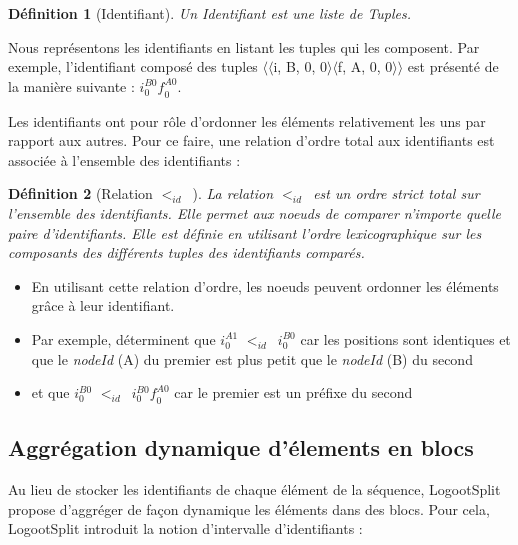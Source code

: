 \documentclass[12pt]{thesul}
\newtheorem{definition}{Définition}
\newcommand{\trm}[1]{\mathit{#1}}
\newcommand{\id}[3]{$\trm{#1}^{\trm{#2}}_{\trm{#3}}$}
\newcommand{\lid}{$<_{id}$~}
\begin{document}
\begin{definition}[Identifiant]
  Un \emph{Identifiant} est une liste de \emph{Tuples}.
\end{definition}


Nous représentons les identifiants en listant les tuples qui les composent.
Par exemple, l'identifiant composé des tuples $\langle\langle$i, B, 0, 0$\rangle\langle$f, A, 0, 0$\rangle\rangle$ est présenté de la manière suivante : \id{i}{B0}{0}\id{f}{A0}{0}.

Les identifiants ont pour rôle d'ordonner les éléments relativement les uns par rapport aux autres.
Pour ce faire, une relation d'ordre total aux identifiants est associée à l'ensemble des identifiants :

\begin{definition}[Relation \lid]
  La relation \lid est un ordre strict total sur l'ensemble des identifiants.
  Elle permet aux noeuds de comparer n'importe quelle paire d'identifiants.
  Elle est définie en utilisant l'ordre lexicographique sur les composants des différents tuples des identifiants comparés.
\end{definition}

\begin{itemize}
  \item En utilisant cette relation d'ordre, les noeuds peuvent ordonner les éléments grâce à leur identifiant.
  \item Par exemple, déterminent que \id{i}{A1}{0} \lid \id{i}{B0}{0} car les positions sont identiques et que le \emph{nodeId} (A) du premier est plus petit que le \emph{nodeId} (B) du second
  \item et que \id{i}{B0}{0} \lid \id{i}{B0}{0}\id{f}{A0}{0} car le premier est un préfixe du second
\end{itemize}


\subsection{Aggrégation dynamique d'élements en blocs}

\label{sec:blocs}

Au lieu de stocker les identifiants de chaque élément de la séquence, LogootSplit propose d'aggréger de façon dynamique les éléments dans des blocs.
Pour cela, LogootSplit introduit la notion d'intervalle d'identifiants :
\end{document}
